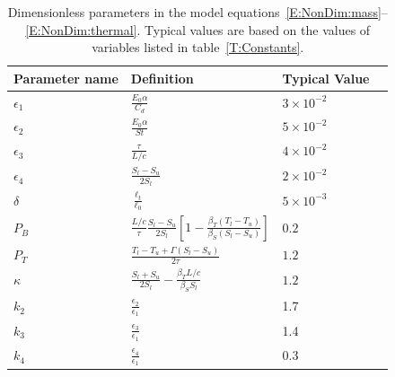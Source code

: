 \documentclass[openacc]{rsproca_new}%
\newcommand{\epsone}{\epsilon_{1}} %
\newcommand{\epstwo}{\epsilon_{2}} %
\newcommand{\epsthree}{\epsilon_{3}} %
\newcommand{\epsfour}{\epsilon_{4}}
\newcommand{\Pb}{\textit{P}_B}  %
\newcommand{\lt}{\delta} %
\newcommand{\Pt}{\textit{P}_T}
\begin{document}
\begin{table}[!h]
\caption{Dimensionless parameters in the model equations~\eqref{E:NonDim:mass}--\eqref{E:NonDim:thermal}. Typical values are based on the values of variables listed in table~\ref{T:Constants}.}\label{T:Dimensionless_Parameters}
\begin{center}
\begin{tabular}{llll}

Parameter name  & Definition   & Typical Value \\
\hline 
\vspace{2pt}
\vspace{2pt}$\epsone$ & $  \frac{E_0 \alpha}{C_d} $  &$ 3 \times 10^{-2}$ \\
\vspace{2pt}$\epstwo$ & $  \frac{E_0 \alpha}{St} $ & $ 5 \times 10^{-2}$ \\
\vspace{2pt}$\epsthree$ & $  \frac{\tau}{L/c} $ & $ 4 \times 10^{-2}$ \\
\vspace{2pt}$\epsfour$ & $  \frac{S_l - S_u}{2 S_l} $  &$ 2 \times 10^{-2}$ \\
\vspace{2pt}$\lt$ & $  \frac{\ell_t}{\ell_0} $ & $  5 \times 10^{-3}$ \\
\vspace{2pt}$\Pb$ & $  \frac{L/c}{ \tau}\frac{S_l - S_u}{2S_l}\left[1 - \frac{\beta_T (T_l - T_u)}{\beta_S (S_l - S_u)}\right]$   & $  0.2$ \\
\vspace{2pt}$\Pt$ & $ \frac{T_l - T_u + \Gamma( S_l - S_u)}{2 \tau}$ & $  1.2$ \\
\vspace{2pt}$\kappa$ & $ \frac{S_l + S_u}{2S_l} -  \frac{\beta_T L/c}{ \beta_S S_l}$ &  $  1.2$ \\
\hline
\vspace{2pt}$k_2$ & $\frac{\epstwo}{\epsone}$ & 1.7\\
\vspace{2pt}$k_3$ & $\frac{\epsthree} {\epsone}$ & 1.4\\
\vspace{2pt}$k_4$ & $\frac{\epsfour}{\epsone}$ & 0.3\\
\end{tabular}
\end{center}
\vspace*{-4pt}
\end{table}
 
\end{document}
